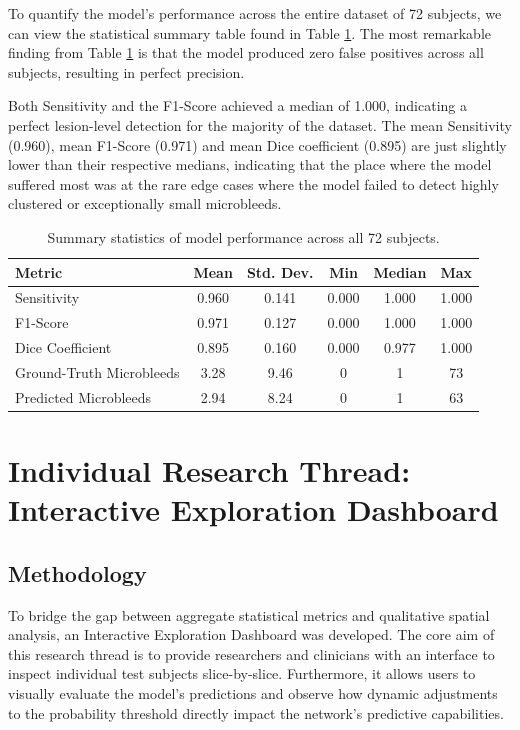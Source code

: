 \documentclass{aifyp}
\begin{document}
To quantify the model's performance across the entire dataset of 72 subjects, we can view the statistical summary table found in Table \ref{tab:summary_stats}. The most remarkable finding from Table \ref{tab:summary_stats} is that the model produced zero false positives across all subjects, resulting in perfect precision.

Both Sensitivity and the F1-Score achieved a median of 1.000, indicating a perfect lesion-level detection for the majority of the dataset. The mean Sensitivity (0.960), mean F1-Score (0.971) and mean Dice coefficient (0.895) are just slightly lower than their respective medians, indicating that the place where the model suffered most was at the rare edge cases where the model failed to detect highly clustered or exceptionally small microbleeds.

\begin{table}[H]
    \centering
    \begin{tabular}{l c c c c c}
        \hline
        \textbf{Metric} & \textbf{Mean} & \textbf{Std. Dev.} & \textbf{Min} & \textbf{Median} & \textbf{Max} \\
        \hline
        Sensitivity & 0.960 & 0.141 & 0.000 & 1.000 & 1.000 \\
        F1-Score & 0.971 & 0.127 & 0.000 & 1.000 & 1.000 \\
        Dice Coefficient & 0.895 & 0.160 & 0.000 & 0.977 & 1.000 \\
        Ground-Truth Microbleeds & 3.28 & 9.46 & 0 & 1 & 73 \\
        Predicted Microbleeds & 2.94 & 8.24 & 0 & 1 & 63 \\
        \hline
    \end{tabular}
    \vspace{0.2cm}
    \caption{Summary statistics of model performance across all 72 subjects.}
    \label{tab:summary_stats}
\end{table}

\FloatBarrier
\clearpage

\section{Individual Research Thread: Interactive Exploration Dashboard}
\subsection{Methodology}
To bridge the gap between aggregate statistical metrics and qualitative spatial analysis, an Interactive Exploration Dashboard was developed. The core aim of this research thread is to provide researchers and clinicians with an interface to inspect individual test subjects slice-by-slice. Furthermore, it allows users to visually evaluate the model's predictions and observe how dynamic adjustments to the probability threshold directly impact the network's predictive capabilities.
\\
\end{document}
